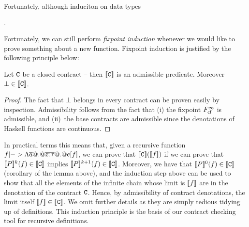 Fortunately, although induciton on data types 

.

Fortunately, we can still perform {\em fixpoint induction} whenever we would like to prove something 
about a new function. Fixpoint induction is justified by the following principle below:

\begin{lemma} Let ${\tt C}$ be a closed contract -- then $[\![{\tt C}]\!]$ is an 
admissible predicate. Moreover $\bot \in [\![{\tt C}]\!]$. \end{lemma}
\begin{proof}
The fact that $\bot$ belongs in every contract can be proven easily by inspection.
Admissibility follows from the fact that (i) the fixpoint $F_{\textsf{cf}}^{\infty}$ is admissible, 
and (ii)~the base contracts are admissible since the denotations of Haskell functions 
are continuous.
\end{proof}

In practical terms this means that, given a recursive function $f |-> \Lambda \overline{a} @.@ \overline{x{:}\tau} @.@ e[f]$, 
we can prove that $[\![{\tt C}]\!]([\![f]\!])$ if we can prove that 
$ [\![P]\!]^{k}(f) \in [\![{\tt C}]\!]$ implies $[\![P]\!]^{k+1}(f) \in [\![{\tt C}]\!]$. Moreover, we have that 
$ [\![P]\!]^{0}(f) \in [\![{\tt C}]\!]$ (corollary of the lemma above), and the induction step above can be 
used to show that all the elements of the infinite chain whose limit is $[\![f]\!]$ are in the denotation of 
the contract ${\tt C}$. Hence, by admissibility of contract denotations, the limit itself $[\![f]\!] \in [\![{\tt C}]\!]$. 
We omit further details as they are simply tedious tidying up of definitions. This induction principle is the basis
of our contract checking tool for recursive definitions.
